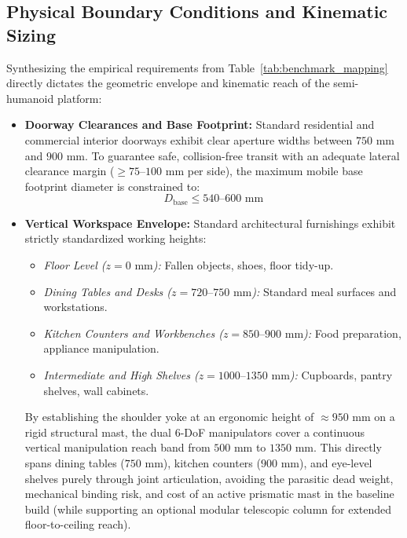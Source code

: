\subsection{Physical Boundary Conditions and Kinematic Sizing}
Synthesizing the empirical requirements from Table~\ref{tab:benchmark_mapping} directly dictates the geometric envelope and kinematic reach of the semi-humanoid platform:

\begin{itemize}[leftmargin=1.5em]
  \item \textbf{Doorway Clearances and Base Footprint:} Standard residential and commercial interior doorways exhibit clear aperture widths between $750\text{ mm}$ and $900\text{ mm}$. To guarantee safe, collision-free transit with an adequate lateral clearance margin ($\ge 75\text{--}100\text{ mm}$ per side), the maximum mobile base footprint diameter is constrained to:
  \begin{equation}
  D_{\text{base}} \le 540\text{--}600\text{ mm}
  \end{equation}
  
  \item \textbf{Vertical Workspace Envelope:} Standard architectural furnishings exhibit strictly standardized working heights:
  \begin{itemize}
    \item \emph{Floor Level ($z = 0\text{ mm}$):} Fallen objects, shoes, floor tidy-up.
    \item \emph{Dining Tables and Desks ($z = 720\text{--}750\text{ mm}$):} Standard meal surfaces and workstations.
    \item \emph{Kitchen Counters and Workbenches ($z = 850\text{--}900\text{ mm}$):} Food preparation, appliance manipulation.
    \item \emph{Intermediate and High Shelves ($z = 1000\text{--}1350\text{ mm}$):} Cupboards, pantry shelves, wall cabinets.
  \end{itemize}
  By establishing the shoulder yoke at an ergonomic height of $\approx 950\text{ mm}$ on a rigid structural mast, the dual 6-DoF manipulators cover a continuous vertical manipulation reach band from $500\text{ mm}$ to $1350\text{ mm}$. This directly spans dining tables ($750\text{ mm}$), kitchen counters ($900\text{ mm}$), and eye-level shelves purely through joint articulation, avoiding the parasitic dead weight, mechanical binding risk, and cost of an active prismatic mast in the baseline build (while supporting an optional modular telescopic column for extended floor-to-ceiling reach).
  

\end{itemize}
